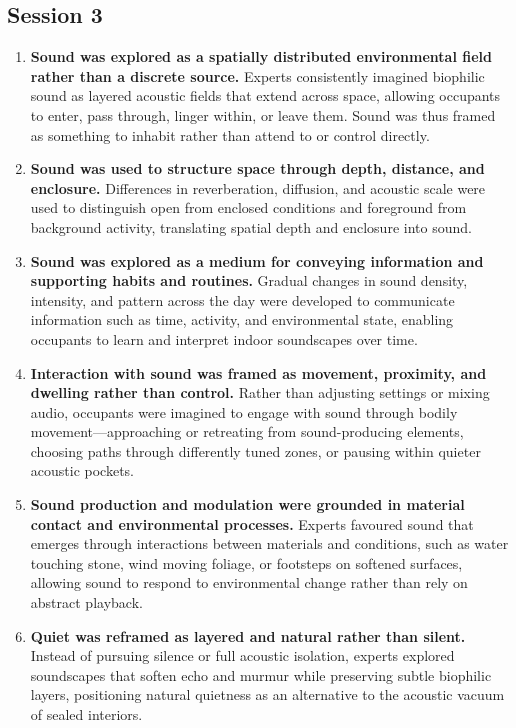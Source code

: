 \subsection{Session 3}
\label{apx-s3}
\begin{enumerate}
\item \textbf{Sound was explored as a spatially distributed environmental field rather than a discrete source.}  
Experts consistently imagined biophilic sound as layered acoustic fields that extend across space, allowing occupants to enter, pass through, linger within, or leave them. Sound was thus framed as something to inhabit rather than attend to or control directly.

\item \textbf{Sound was used to structure space through depth, distance, and enclosure.}  
Differences in reverberation, diffusion, and acoustic scale were used to distinguish open from enclosed conditions and foreground from background activity, translating spatial depth and enclosure into sound.

\item \textbf{Sound was explored as a medium for conveying information and supporting habits and routines.}  
Gradual changes in sound density, intensity, and pattern across the day were developed to communicate information such as time, activity, and environmental state, enabling occupants to learn and interpret indoor soundscapes over time.

\item \textbf{Interaction with sound was framed as movement, proximity, and dwelling rather than control.}  
Rather than adjusting settings or mixing audio, occupants were imagined to engage with sound through bodily movement—approaching or retreating from sound-producing elements, choosing paths through differently tuned zones, or pausing within quieter acoustic pockets.

\item \textbf{Sound production and modulation were grounded in material contact and environmental processes.}  
Experts favoured sound that emerges through interactions between materials and conditions, such as water touching stone, wind moving foliage, or footsteps on softened surfaces, allowing sound to respond to environmental change rather than rely on abstract playback.

\item \textbf{Quiet was reframed as layered and natural rather than silent.}  
Instead of pursuing silence or full acoustic isolation, experts explored soundscapes that soften echo and murmur while preserving subtle biophilic layers, positioning natural quietness as an alternative to the acoustic vacuum of sealed interiors.
\end{enumerate}